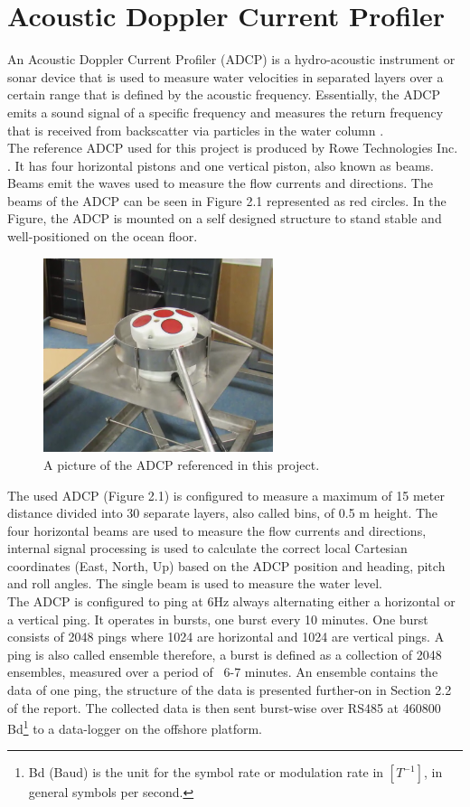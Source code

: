 \section{Acoustic Doppler Current Profiler}
An Acoustic Doppler Current Profiler (ADCP) is a hydro-acoustic instrument or sonar device that is used to measure water velocities in separated layers over a certain range that is defined by the acoustic frequency. Essentially, the ADCP emits a sound signal of a specific frequency and measures the return frequency that is received from backscatter via particles in the water column \cite{adcp_def}.\\
The reference ADCP used for this project is produced by Rowe Technologies Inc. \cite{rowe}. It has four horizontal pistons and one vertical piston, also known as beams. Beams emit the waves used to measure the flow currents and directions. The beams of the ADCP can be seen in Figure 2.1 represented as red circles. In the Figure, the ADCP is mounted on a self designed structure to stand stable and well-positioned on the ocean floor.\\
\begin{figure}[h]
\centering
      \includegraphics[width=0.6\textwidth]{adcp}
        \caption{A picture of the ADCP referenced in this project.}
\end{figure}
The used ADCP (Figure 2.1) is configured to measure a maximum of 15 meter distance divided into 30 separate layers, also called bins, of 0.5 m height. The four horizontal beams are used to measure the flow currents and directions, internal signal processing is used to calculate the correct local Cartesian coordinates (East, North, Up) based on the ADCP position and heading, pitch and roll angles. The single beam is used to measure the water level.\\
The ADCP is configured to ping at 6Hz always alternating either a horizontal or a vertical ping. It operates in bursts, one burst every 10 minutes. One burst consists of 2048 pings where 1024 are horizontal and 1024 are vertical pings. A ping is also called ensemble therefore, a burst is defined as a collection of 2048 ensembles, measured over a period of ~6-7 minutes. An ensemble contains the data of one ping, the structure of the data is presented further-on in Section 2.2 of the report. The collected data is then sent burst-wise over RS485 at 460800 Bd\footnote{\label{foot:2} Bd (Baud) is the unit for the symbol rate or modulation rate in $[T^{-1}]$, in general symbols per second.} to a data-logger on the offshore platform.

